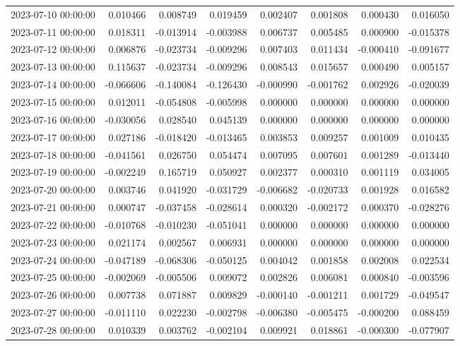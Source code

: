 \begin{tabular}{lrrrrrrr}
2023-07-10 00:00:00 & 0.010466 & 0.008749 & 0.019459 & 0.002407 & 0.001808 & 0.000430 & 0.016050 \\
2023-07-11 00:00:00 & 0.018311 & -0.013914 & -0.003988 & 0.006737 & 0.005485 & 0.000900 & -0.015378 \\
2023-07-12 00:00:00 & 0.006876 & -0.023734 & -0.009296 & 0.007403 & 0.011434 & -0.000410 & -0.091677 \\
2023-07-13 00:00:00 & 0.115637 & -0.023734 & -0.009296 & 0.008543 & 0.015657 & 0.000490 & 0.005157 \\
2023-07-14 00:00:00 & -0.066606 & -0.140084 & -0.126430 & -0.000990 & -0.001762 & 0.002926 & -0.020039 \\
2023-07-15 00:00:00 & 0.012011 & -0.054808 & -0.005998 & 0.000000 & 0.000000 & 0.000000 & 0.000000 \\
2023-07-16 00:00:00 & -0.030056 & 0.028540 & 0.045139 & 0.000000 & 0.000000 & 0.000000 & 0.000000 \\
2023-07-17 00:00:00 & 0.027186 & -0.018420 & -0.013465 & 0.003853 & 0.009257 & 0.001009 & 0.010435 \\
2023-07-18 00:00:00 & -0.041561 & 0.026750 & 0.054474 & 0.007095 & 0.007601 & 0.001289 & -0.013440 \\
2023-07-19 00:00:00 & -0.002249 & 0.165719 & 0.050927 & 0.002377 & 0.000310 & 0.001119 & 0.034005 \\
2023-07-20 00:00:00 & 0.003746 & 0.041920 & -0.031729 & -0.006682 & -0.020733 & 0.001928 & 0.016582 \\
2023-07-21 00:00:00 & 0.000747 & -0.037458 & -0.028614 & 0.000320 & -0.002172 & 0.000370 & -0.028276 \\
2023-07-22 00:00:00 & -0.010768 & -0.010230 & -0.051041 & 0.000000 & 0.000000 & 0.000000 & 0.000000 \\
2023-07-23 00:00:00 & 0.021174 & 0.002567 & 0.006931 & 0.000000 & 0.000000 & 0.000000 & 0.000000 \\
2023-07-24 00:00:00 & -0.047189 & -0.068306 & -0.050125 & 0.004042 & 0.001858 & 0.002008 & 0.022534 \\
2023-07-25 00:00:00 & -0.002069 & -0.005506 & 0.009072 & 0.002826 & 0.006081 & 0.000840 & -0.003596 \\
2023-07-26 00:00:00 & 0.007738 & 0.071887 & 0.009829 & -0.000140 & -0.001211 & 0.001729 & -0.049547 \\
2023-07-27 00:00:00 & -0.011110 & 0.022230 & -0.002798 & -0.006380 & -0.005475 & -0.000200 & 0.088459 \\
2023-07-28 00:00:00 & 0.010339 & 0.003762 & -0.002104 & 0.009921 & 0.018861 & -0.000300 & -0.077907 \\

\end{tabular}
